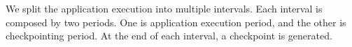 \documentclass[conference]{IEEEtran}
\begin{document}


We split the application execution into multiple intervals.
Each interval is composed by two periods.
One is application execution period, and the other is checkpointing period.
At the end of each interval, a checkpoint is generated.

%


\end{document}
